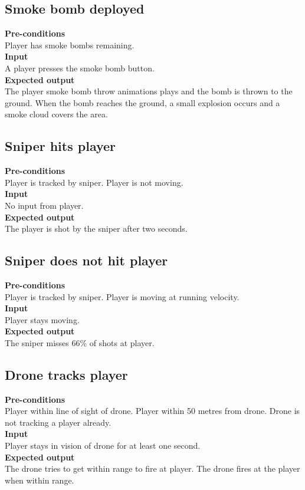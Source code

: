 \documentclass[a4paper,10pt]{article}
\begin{document}
    \subsection{Smoke bomb deployed}
    \textbf{Pre-conditions}\\
    Player has smoke bombs remaining.
    \smallskip\\\textbf{Input}\\
    A player presses the smoke bomb button.
    \smallskip\\\textbf{Expected output}\\
    The player smoke bomb throw animations plays and the bomb is thrown to the ground. When the bomb reaches the ground, a small explosion occurs and a smoke cloud covers the area.
    
    \subsection{Sniper hits player}
    \textbf{Pre-conditions}\\
    Player is tracked by sniper. Player is not moving.
    \smallskip\\\textbf{Input}\\
    No input from player.
    \smallskip\\\textbf{Expected output}\\
    The player is shot by the sniper after two seconds.
    
    \subsection{Sniper does not hit player}
    \textbf{Pre-conditions}\\
    Player is tracked by sniper. Player is moving at running velocity.
    \smallskip\\\textbf{Input}\\
    Player stays moving.
    \smallskip\\\textbf{Expected output}\\
    The sniper misses 66\% of shots at player.
    
    \subsection{Drone tracks player}
    \textbf{Pre-conditions}\\
    Player within line of sight of drone. Player within 50 metres from drone. Drone is not tracking a player already.
    \smallskip\\\textbf{Input}\\
    Player stays in vision of drone for at least one second.
    \smallskip\\\textbf{Expected output}\\
    The drone tries to get within range to fire at player. The drone fires at the player when within range.
    
\end{document}
